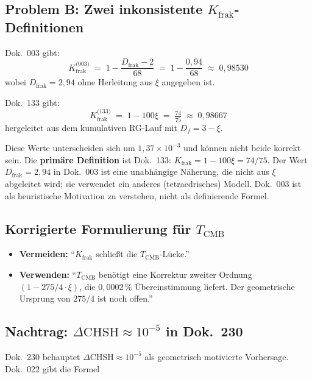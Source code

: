 \subsection*{Problem B: Zwei inkonsistente $K_\text{frak}$-Definitionen}

Dok.~003 gibt:
\begin{equation}
  K_\text{frak}^\text{(003)} \;=\; 1 - \frac{D_\text{frak} - 2}{68}
  \;=\; 1 - \frac{0{,}94}{68} \;\approx\; 0{,}98530
  \tag{190.18}
\end{equation}
wobei $D_\text{frak} = 2{,}94$ ohne Herleitung aus $\xi$ angegeben ist.

Dok.~133 gibt:
\begin{equation}
  K_\text{frak}^\text{(133)} \;=\; 1 - 100\xi \;=\; \tfrac{74}{75}
  \;\approx\; 0{,}98667
  \tag{190.19}
\end{equation}
hergeleitet aus dem kumulativen RG-Lauf mit $D_f = 3 - \xi$.

Diese Werte unterscheiden sich um $1{,}37 \times 10^{-3}$ und können
nicht beide korrekt sein. Die \textbf{primäre Definition} ist Dok.~133:
$K_\text{frak} = 1 - 100\xi = 74/75$. Der Wert $D_\text{frak} = 2{,}94$ in
Dok.~003 ist eine unabhängige Näherung, die nicht aus $\xi$ abgeleitet
wird; sie verwendet ein anderes (tetraedrisches) Modell.
Dok.~003 ist als heuristische Motivation zu verstehen, nicht als
definierende Formel.

\subsection*{Korrigierte Formulierung für $T_\text{CMB}$}

\begin{itemize}
  \item \textbf{Vermeiden:} \enquote{$K_\text{frak}$ schließt die
        $T_\text{CMB}$-Lücke.}
  \item \textbf{Verwenden:} \enquote{$T_\text{CMB}$ benötigt eine
        Korrektur zweiter Ordnung $(1 - 275/4\cdot\xi)$, die
        $0{,}0002\,\%$ Übereinstimmung liefert. Der geometrische
        Ursprung von $275/4$ ist noch offen.}
\end{itemize}

\subsection*{Nachtrag: $\Delta\text{CHSH} \approx 10^{-5}$ in Dok.~230}

Dok.~230 behauptet $\Delta\text{CHSH} \approx 10^{-5}$ als geometrisch
motivierte Vorhersage. Dok.~022 gibt die Formel

